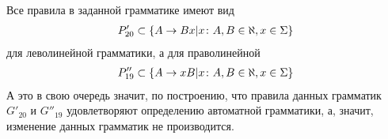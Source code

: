 Все правила в заданной грамматике имеют вид
\begin{align*}
	P'_{20} \subset \left\{A\to Bx|x \colon A, B \in \aleph, x \in \Sigma\right\}
\end{align*}
для леволинейной грамматики, а для праволинейной
\begin{align*}
	P''_{19} \subset \left\{A\to xB|x \colon A, B \in \aleph, x \in \Sigma\right\}
\end{align*}
А это в свою очередь значит, по построению, что правила данных грамматик \(G'_{20}\) и \(G''_{19}\) удовлетворяют определению автоматной грамматики, а, значит, изменение данных грамматик не производится.
